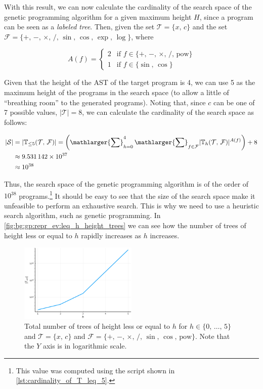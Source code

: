  With this result, we can now calculate the cardinality of the search space of
  the genetic programming algorithm for a given maximum height \(H\), since a
  program can be seen as a \emph{labeled tree}.
  Then, given the set \(\mathcal{T} = \{x,\, c\}\) and the set \(\mathcal{F} =
  \{+,\, -,\, \times,\, /,\, \sin,\, \cos,\, \exp,\, \log\}\), where 

  \[
    A(f) = \begin{cases}
      2 & \text{if } f \in \{+,\, -,\, \times,\, /,\, \mathrm{pow}\} \\
      1 & \text{if } f \in \{\sin,\, \cos\}
    \end{cases}
  \]

  Given that the height of the AST of the target program is 4, we can use 5 as 
  the maximum height of the programs in the search space (to allow a little of
  \enquote{breathing room} to the generated programs).
  Noting that, since \(c\) can be one of 7 possible values, \(|\mathcal{T}| = 
  8\), we can calculate the cardinality of the search space as follows:

  \begin{align*}
    |\mathcal{S}| 
      &= |\mathbb{T}_{\leq 5}(\mathcal{T},\, \mathcal{F})| 
        = \left(\mathlarger{\sum}_{h = 0}^{4}\,
          \mathlarger{\sum}_{f \in \mathcal{F}} 
          |\mathbb{T}_{h}(\mathcal{T},\, \mathcal{F})|^{A(f)}
        \right) + 8 \\
      &\approx 9.531\,142 \times 10^{37}  \\
      &\approx 10^{38}
  \end{align*}

  Thus, the search space of the genetic programming algorithm is of the order of
  \(10^{38}\) programs.\footnote{%
    This value was computed using the script shown in 
    \vref{lst:cardinality_of_T_leq_5}.
  }
  It should be easy to see that the size of the search space make it unfeasible
  to perform an exhaustive search.
  This is why we need to use a heuristic search algorithm, such as genetic
  programming.
  In \vref{fig:bg:gp:repr_ev:leq_h_height_trees} we can see how the number of
  trees of height less or equal to \(h\) rapidly increases as \(h\) increases.

  \begin{figure}[ht!]
    \centering
    \includegraphics[width=0.5\textwidth]{img/theoretical_framework/t_leq.png}
    \caption{
      Total number of trees of height less or equal to \(h\) for \(h \in
      \{0,\, \ldots,\, 5\}\) and \(\mathcal{T} = \{x,\, c\}\) and \(\mathcal{F}
      = \{+,\, -,\, \times,\, /,\, \sin,\, \cos,\, \mathrm{pow}\}\).
      Note that the \(Y\) axis is in logarithmic scale.
    }
    \label{fig:bg:gp:repr_ev:leq_h_height_trees}
  \end{figure}